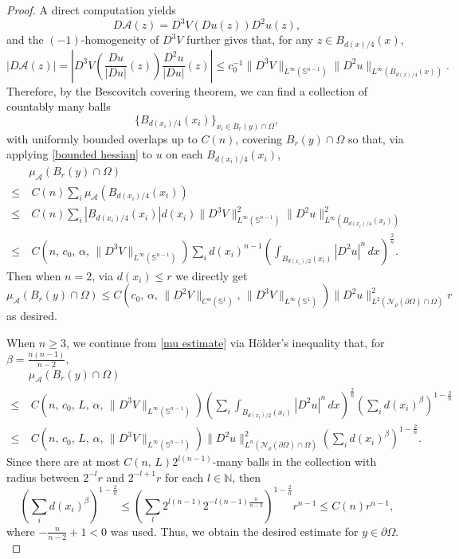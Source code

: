 \documentclass[reqno,11pt]{amsart}
\def\az{\alpha}
\numberwithin{equation}{section}
\theoremstyle{remark}
\begin{document}
\begin{proof}
    A direct computation yields
    $$D\mathcal A(z)= D^3V(Du(z))D^2u(z), $$
    and the $(-1)$-homogeneity of $D^3V$ further gives that,  for any $z\in B_{ {d(x)} /4}(x)$, 
    $$|D\mathcal A(z)|= \left|D^3V\left(\frac{Du}{|Du|}(z)\right)\frac{D^2u}{|Du|}(z)\right|\le c_0^{-1}\|D^3V\|_{L^\infty(\mathbb S^{n-1})}\|D^2u\|_{L^\infty(B_{ {d(x)} /4}(x))}.$$
    Therefore, by the Bescovitch covering theorem, we can find a collection of countably many balls 
    $$\{B_{d(x_i)/4}(x_i)\}_{x_i\in B_r(y)\cap \Omega},$$
    with uniformly bounded overlaps up to $C(n)$, covering $B_r(y)\cap \Omega$ so that,  via applying \eqref{bounded hessian} to $u$ on each $B_{d(x_i)/4}(x_i)$, 
\begin{align}
    & \mu_\mathcal A({B_r(y)\cap \Omega})\nonumber\\
    \le& \ C(n)\sum_{i} \mu_\mathcal A(B_{d(x_i)/4}(x_i))\nonumber\\
    \le & \ C(n)\sum_{i} |B_{d(x_i)/4}(x_i)| d(x_i) \|D^3V\|^2_{L^\infty(\mathbb S^{n-1})}\|D^2u\|^2_{L^\infty(B_{d(x_i)/4}(x_i))}\nonumber\\
    \le & \ C(n,\,c_0,\,\az,\, \|D^3V\|_{L^\infty(\mathbb S^{n-1})}) \sum_i  d(x_i)^{n-1} \left(\int_{B_{d(x_i)/2}(x_i)} |D^2 u|^n\, dx\right)^{\frac 2 n}.\label{mu estimate}
\end{align}
Then when $n=2$, via $d(x_i)\le r$ we directly get 
$$ \mu_\mathcal A({B_r(y)\cap \Omega})\le  C(c_0,\,\az,\,\|D^2V\|_{C^\az(\mathbb S^{1})},\,\|D^3V\|_{L^\infty(\mathbb S^{1})}) \| D^2 u\|^{2}_{L^2(\mathcal N_\rho(\partial \Omega)\cap \Omega)}r$$
as desired. 

When $n\ge 3$, we continue from \eqref{mu estimate} via H\"older's inequality that, for $\beta=\frac{n(n-1)}{n-2},$
\begin{align*}
    & \mu_\mathcal A({B_r(y)\cap \Omega})\\
    \le & \  C(n,\,c_0,\,L,\,\az,\, \|D^3V\|_{L^\infty(\mathbb S^{n-1})}) \left( \sum_i \int_{B_{d(x_i)/2}(x_i)} |D^2 u|^n\, dx\right)^{\frac 2 n}\left(\sum_id(x_i)^\beta\right)^{1-\frac 2 n}   \\
    \le & \  C(n,\,c_0,\,L,\,\az,\, \|D^3V\|_{L^\infty(\mathbb S^{n-1})}) \| D^2 u\|^{2}_{L^n(\mathcal N_\rho(\partial \Omega)\cap \Omega)}\left(\sum_id(x_i)^\beta\right)^{1-\frac 2 n}.
\end{align*}
Since there are at most $C(n,\,L)2^{l(n-1)} $-many balls in the collection with radius between $2^{-l} r$ and $2^{-l+1}r$ for each $l\in \mathbb N$, then
$$\left(\sum_id(x_i)^\beta\right)^{ 1-\frac 2 n}\le \left(\sum_l 2^{l(n-1)} 2^{-l(n-1)\frac{n}{n-2}}\right)^{ 1-\frac 2 n} r^{n-1}\le C(n)r^{n-1},$$
where  $-\frac{n}{n-2}+1<0$ was used. 
Thus, we obtain the desired estimate for $y\in \partial \Omega. $   
\end{proof}
\end{document}
